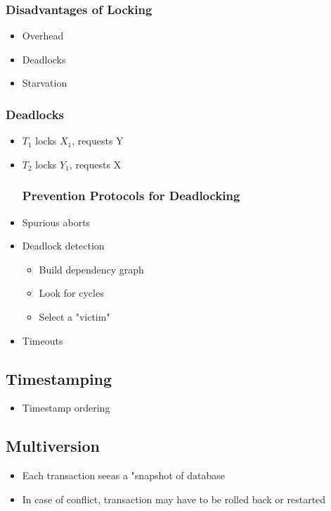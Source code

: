 \documentclass[12pt]{article}
\begin{document}
		\subsubsection*{Disadvantages of Locking}
		\begin{itemize}
			\item
				Overhead
			\item
				Deadlocks
			\item
				Starvation
		\end{itemize}
		\subsubsection*{Deadlocks}
		\begin{itemize}
			\item
				$T_1$ locks $X_1$, requests Y
			\item
				$T_2$ locks $Y_1$, requests X

		\subsubsection*{Prevention Protocols for Deadlocking}
			\item
				Spurious aborts
			\item
				Deadlock detection
				\begin{itemize}
					\item
						Build dependency graph
					\item
						Look for cycles
					\item
						Select a "victim"
				\end{itemize}
			\item
				Timeouts
		\end{itemize}
		\subsection*{Timestamping}
		\begin{itemize}
			\item
				Timestamp ordering
		\end{itemize}
		\subsection*{Multiversion}
		\begin{itemize}
			\item
				Each transaction seeas a "snapshot of database
			\item
				In case of conflict, transaction may have to be rolled back or restarted
		\end{itemize}
\end{document}
